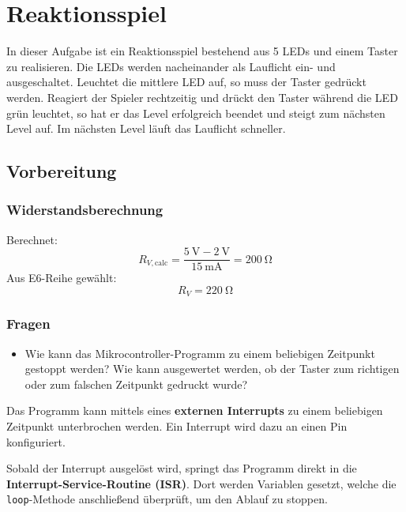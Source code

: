 
\newpage
\section{Reaktionsspiel}

In dieser Aufgabe ist ein Reaktionsspiel bestehend aus 5 LEDs und einem Taster zu realisieren. Die LEDs werden nacheinander als Lauflicht ein- und ausgeschaltet. Leuchtet die mittlere LED auf, so muss der Taster gedrückt werden. Reagiert der Spieler rechtzeitig und drückt den Taster während die LED grün leuchtet, so hat er das Level erfolgreich beendet und steigt zum nächsten Level auf. Im nächsten Level läuft das Lauflicht schneller. 

\subsection{Vorbereitung}
\subsubsection{Widerstandsberechnung}

Berechnet:
\[
    R_{V,\text{calc}} = \frac{\SI{5}{\volt} - \SI{2}{\volt}}{\SI{15}{\milli\ampere}} = \SI{200}{\ohm}
\]
Aus E6-Reihe gewählt:
\[
    R_{V} = \SI{220}{\ohm}
\]

\subsubsection{Fragen}

\begin{block}
    \begin{itemize}
    \item[\faQuestion] Wie kann das Mikrocontroller-Programm zu einem beliebigen Zeitpunkt gestoppt werden? Wie kann ausgewertet werden, ob der Taster zum richtigen oder zum falschen Zeitpunkt gedruckt wurde? 
    \end{itemize}
\end{block}

Das Programm kann mittels eines \textbf{externen Interrupts} zu einem beliebigen Zeitpunkt unterbrochen werden. Ein Interrupt wird dazu an einen Pin konfiguriert. 

Sobald der Interrupt ausgelöst wird, springt das Programm direkt in die \textbf{Interrupt-Service-Routine (ISR)}. Dort werden Variablen gesetzt, welche die \texttt{loop}-Methode anschließend überprüft, um den Ablauf zu stoppen. 

